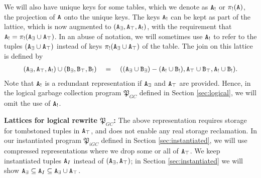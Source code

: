 \documentclass{article}
\numberwithin{equation}{section}
\renewcommand{\tt}[1]{\ifmmode\text{\texttt{#1}}\else\texttt{#1}\fi}
\begin{document}
We will also have unique keys for some tables, which we denote as $\tt{A}_!$ or $\pi_!(\tt{A})$, the projection of $\tt{A}$ onto the unique keys.
The keys $\tt{A}_!$ can be kept as part of the lattice, which is now augmented to $(\tt{A}_\exists, \tt{A}_\top, \tt{A}_!)$, with the requirement that $\tt{A}_! = \pi_!(\tt{A}_\exists \cup \tt{A}_\top)$.
In an abuse of notation, we will sometimes use $\tt{A}_!$ to refer to the tuples $(\tt{A}_\exists \cup \tt{A}_\top)$ instead of keys $\pi_!(\tt{A}_\exists \cup \tt{A}_\top)$ of the table.
The join on this lattice is defined by
\begin{align*}
(\tt{A}_\exists, \tt{A}_\top, \tt{A}_!) \cup (\tt{B}_\exists, \tt{B}_\top, \tt{B}_!) \quad=\quad ((\tt{A}_\exists \cup \tt{B}_\exists) - (\tt{A}_! \cup \tt{B}_!), \tt{A}_\top \cup \tt{B}_\top, \tt{A}_! \cup \tt{B}_!).
\end{align*}
Note that $\tt{A}_!$ is a redundant representation if $\tt{A}_\exists$ and $\tt{A}_\top$ are provided.
Hence, in the logical garbage collection program $\mathfrak{P}_{GC}$ defined in Section \ref{sec:logical}, we will omit the use of $\tt{A}_!$.

\textbf{Lattices for logical rewrite $\mathfrak{P}_{GC}$:}
The above representation requires storage for tombstoned tuples in $\tt{A}_\top$, and does not enable any real storage reclamation.
In our instantiated program $\mathfrak{P}_{iGC}$ defined in Section \ref{sec:instantiated}, we will use compressed representations where we drop some or all of $\tt{A}_\top$.
We keep instantiated tuples $\tt{A}_I$ instead of $(\tt{A}_\exists, \tt{A}_\top)$; in Section \ref{sec:instantiated} we will show $\tt{A}_\exists \subseteq \tt{A}_I \subseteq \tt{A}_\exists \cup \tt{A}_\top$.
\end{document}
